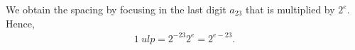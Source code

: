 \begin{questions}

\begin{solution}
We obtain the spacing by focusing in the last digit $a_{23}$ that is multiplied by $2^e$. Hence,
\begin{align*}
1~ulp=2^{-23}2^e=2^{e-23}.
\end{align*}

\end{solution}
\end{questions}
